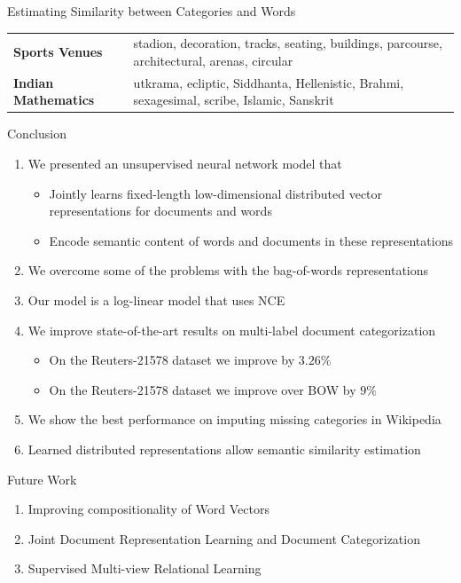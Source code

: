 \documentclass[10pt]{beamer}
\begin{document}
\begin{frame}{Estimating Similarity between Categories and Words }
\begin{table}[h!]
\begin{center}
\begin{tabular}{l@{\hskip3mm} l}
\textbf{Sports Venues}          & stadion, decoration, tracks, seating, buildings, parcourse, architectural, arenas, circular \\
\textbf{Indian Mathematics}     & utkrama, ecliptic, Siddhanta, Hellenistic, Brahmi, sexagesimal, scribe, Islamic, Sanskrit \\
\bottomrule         
\end{tabular}
\end{center}
\end{table}
\end{frame}

\begin{frame}{Conclusion }
\begin{enumerate}
	\vfill\item<1-> We presented an unsupervised neural network model that 
	\begin{itemize}
		\vfill\item Jointly learns fixed-length low-dimensional distributed vector representations for documents and words
		\vfill\item Encode semantic content of words and documents in these representations
	\end{itemize}
	
	\vfill\item<2-> We overcome some of the problems with the bag-of-words representations 
	\vfill\item<3-> Our model is a log-linear model that uses NCE
	\vfill\item<4-> We improve state-of-the-art results on multi-label document categorization
	\begin{itemize}
		\vfill\item On the Reuters-21578 dataset we improve by $3.26\%$
		\vfill\item On the Reuters-21578 dataset we improve over BOW by $9\%$
	\end{itemize}
	\vfill\item<5-> We show the best performance on imputing missing categories in Wikipedia
	\vfill\item<6-> Learned distributed representations allow semantic similarity estimation
\end{enumerate}
\end{frame}

\begin{frame}{Future Work }
\begin{enumerate}
	\item<1-> Improving compositionality of Word Vectors
	\vfill\item<2-> Joint Document Representation Learning and Document Categorization
	\vfill\item<3-> Supervised Multi-view Relational Learning
\end{enumerate}

\end{frame}
\end{document}
